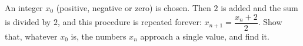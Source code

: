 An integer $x_0$ (positive, negative or zero) is chosen. Then $2$ is added and the sum is divided by $2$, and this procedure is repeated forever: $x_{n+1}=\dfrac{x_n+2}{2}$. Show that, whatever $x_0$ is, the numbers $x_n$ approach a single value, and find it.
